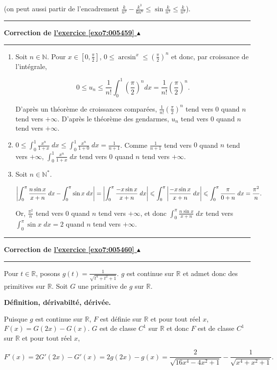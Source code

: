 \documentclass[11pt,a4paper]{article}
\newcommand{\Nn}{\mathbb{N}} \newcommand{\N}{\mathbb{N}}
\newcommand{\Rr}{\mathbb{R}} \newcommand{\R}{\mathbb{R}}
\newcommand{\Arcsin}{\mathop{\mathrm{arcsin}}\nolimits}
\newcounter{exo}
\newcommand{\correction}[1]{\hypertarget{cor7:#1}{}\label{cor7:#1}{\bf Correction de \hyperlink{exo7:#1}{l'exercice \ref{exo7:#1} $\blacktriangle$}}\vspace{1mm}\hrule\vspace{1mm}}
\newcommand{\fincorrection}{\vspace{1mm}\hrule\vspace*{7mm}}
\begin{document}
(on peut aussi partir de l'encadrement $\frac{k}{n^2}-\frac{k^3}{6n^6}\leq\sin\frac{k}{n^2}\leq\frac{k}{n^2}$).
\fincorrection
\correction{005459}
\begin{enumerate}
\item  Soit $n\in\Nn$. Pour $x\in[0,\frac{\pi}{2}]$, $0\leq\Arcsin^x\leq(\frac{\pi}{2})^n$ et donc, par croissance de l'intégrale,

$$0\leq u_n\leq\frac{1}{n!}\int_{0}^{1}(\frac{\pi}{2})^ndx=\frac{1}{n!}(\frac{\pi}{2})^n.$$

D'après un théorème de croissances comparées, $\frac{1}{n!}(\frac{\pi}{2})^n$ tend vers $0$ quand $n$ tend vers $+\infty$. D'après le théorème des gendarmes, $u_n$ tend vers $0$ quand $n$ tend vers $+\infty$.

\item  $0\leq\int_{0}^{1}\frac{x^n}{1+x}\;dx\leq\int_{0}^{1}\frac{x^n}{1+0}\;dx=\frac{1}{n+1}$. Comme $\frac{1}{n+1}$ tend vers $0$ quand $n$ tend vers $+\infty$, $\int_{0}^{1}\frac{x^n}{1+x}\;dx$ tend vers $0$ quand $n$ tend vers $+\infty$.

\item  Soit $n\in\Nn^*$.

\begin{align*}\ensuremath
\left|\int_{0}^{\pi}\frac{n\sin x}{x+n}\;dx-\int_{0}^{\pi}\sin x\;dx\right|=\left|
\int_{0}^{\pi}\frac{-x\sin x}{x+n}\;dx\right|\leq\int_{0}^{\pi}\left|\frac{-x\sin x}{x+n}\;dx\right|
\leq\int_{0}^{\pi}\frac{\pi}{0+n}\;dx=\frac{\pi^2}{n}.
\end{align*}

Or, $\frac{\pi^2}{n}$ tend vers $0$ quand $n$ tend vers $+\infty$, et donc $\int_{0}^{\pi}\frac{n\sin x}{x+n}\;dx$ tend vers $\int_{0}^{\pi}\sin x\;dx=2$ quand $n$ tend vers $+\infty$.

\end{enumerate}
\fincorrection
\correction{005460}
Pour $t\in\Rr$, posons $g(t)=\frac{1}{\sqrt{t^4+t^2+1}}$. $g$ est continue sur $\Rr$ et admet donc des primitives sur $\Rr$. Soit $G$ une primitive de $g$ sur $\Rr$.

\textbf{Définition, dérivabilté, dérivée.}

Puisque $g$ est continue sur $\Rr$, $F$ est définie sur $\Rr$ et pour tout réel $x$, $F(x)=G(2x)-G(x)$. $G$ est de classe $C^1$ sur $\Rr$ et donc $F$ est de classe $C^1$ sur $\Rr$ et pour tout réel $x$,

$$F'(x)=2G'(2x)-G'(x)=2g(2x)-g(x)=\frac{2}{\sqrt{16x^4-4x^2+1}}-\frac{1}{\sqrt{x^4+x^2+1}}.$$
\end{document}
